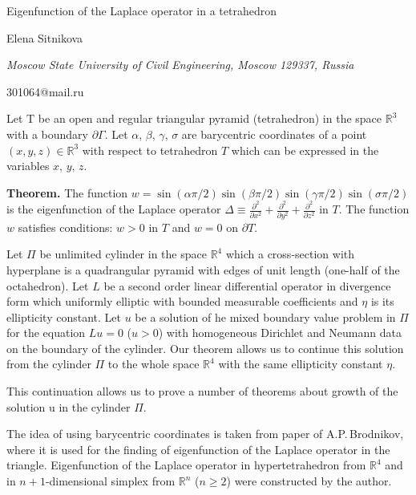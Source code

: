 \documentclass[10pt,a4paper]{article}
\def\R{\mathbb{R}}
\def\p{\partial}
\begin{document}
\begin{center}

{\Large Eigenfunction of the Laplace operator in a tetrahedron}

\bigskip

{\sc Elena Sitnikova}

{\small\it Moscow State University of Civil Engineering, Moscow 129337, Russia}

{\small\rm 301064@mail.ru}


\end{center}

\bigskip


Let T be an open and regular triangular pyramid (tetrahedron) in the space $\R^3$ with a
boundary $\p\Gamma$.
Let $\alpha$, $\beta$, $\gamma$, $\sigma$
are barycentric coordinates of a point $(x, y, z) \in \R^3$
with respect to
tetrahedron $T$ which can be expressed in the variables $x,\, y,\, z$.

\bigskip

\noindent
{\bf Theorem.}
The function $w =\sin(\alpha\pi/2)\sin(\beta\pi/2)\sin(\gamma\pi/2)\sin(\sigma\pi/2)$
is the eigenfunction of the
Laplace operator $\Delta\equiv
\frac{\p^2}{\p x^2}+\frac{\p^2}{\p y^2}+\frac{\p^2}{\p z^2}$
in $T$.
The function $w$ satisfies conditions: $w >0$ in $T$
and $w=0$ on $\p T$.

Let $\Pi$ be unlimited cylinder in the space $\R^4$
which a cross-section with hyperplane is a
quadrangular pyramid with edges of unit length (one-half of the octahedron). Let $L$ be a second
order linear differential operator in divergence form which uniformly elliptic with bounded
measurable coefficients and $\eta$ is its ellipticity constant. Let $u$ be a solution of he mixed boundary
value problem in $\Pi$ for the equation $Lu=0$ ($u>0$) with homogeneous Dirichlet and Neumann data
on the boundary of the cylinder. Our theorem allows us to continue this solution from the
cylinder $\Pi$ to the whole space $\R^4$ with the same ellipticity constant $\eta$.

This continuation allows us to prove a number of theorems about growth of the solution u in
the cylinder $\Pi$.

The idea of using barycentric coordinates is taken from paper of A.P.\,Brodnikov, where it is
used for the finding of eigenfunction of the Laplace operator in the triangle.
Eigenfunction of the Laplace operator in hypertetrahedron from $\R^4$ and in $n+1$-dimensional
simplex from $\R^n$ ($n\ge 2$) were constructed by the author.
\end{document}
